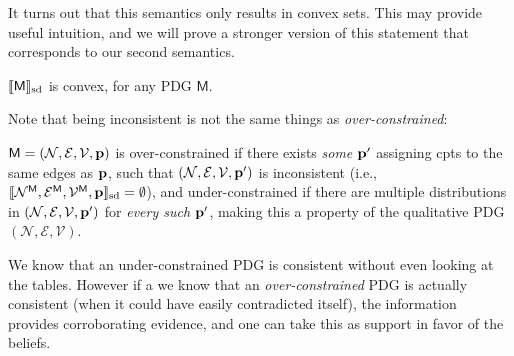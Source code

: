 \documentclass{article}
\newcommand{\notation}[2][]{#1}
\renewcommand{\notation}[2][]{{\color{notationcolor} #2}}
\DeclarePairedDelimiter{\SD}{\llbracket}{\rrbracket_{\text{sd}}}
\newcommand{\V}{\mathcal V}
\newcommand{\N}{\mathcal N}
\newcommand{\Ed}{\mathcal E}
\newcommand{\sfM}{\mathsf M}
\newcommand{\MN}{PDG}
\numberwithin{equation}{section}
\begin{document}
	\begin{vfull}
		It turns out that this semantics only results in convex sets. This may provide useful intuition, and we will prove a stronger version of this statement that corresponds to our second semantics.
		\begin{lemma}[restate=thmsetconvex] 
			\label{prop:convex}
			$\SD{\sfM}$ is convex, for any PDG $\sfM$.
		\end{lemma}
	
		Note that being inconsistent is not the same things as \emph{over-constrained}: 	
		\begin{defn}

			$\sfM = \mnvars[]$ is over-constrained if there exists
			  \emph{some $\mathbf p'$} assigning cpts to the same edges as
			  $\mathbf p$, such that $(\N, \Ed, \V, \mat p')$ is inconsistent
			  \notation{(i.e., $\SD{\N^\sfM, \Ed^\sfM, \V^\sfM, \mat p}
				= \emptyset$)}, and under-constrained if there are
			  multiple distributions in $(\N, \Ed, \V, \mat p')$ for
			  \emph{every such $\mathbf p'$}, making this a property of the
			  qualitative PDG $(\N, \Ed, \V)$.  
		\end{defn}

		We know that an under-constrained PDG is consistent without even looking at the tables. However if a we know that an \emph{over-constrained} PDG is actually consistent (when it could have easily contradicted itself), the information provides corroborating evidence, and one can take this as support in favor of the beliefs. 
	\end{vfull}
        
\end{document}
